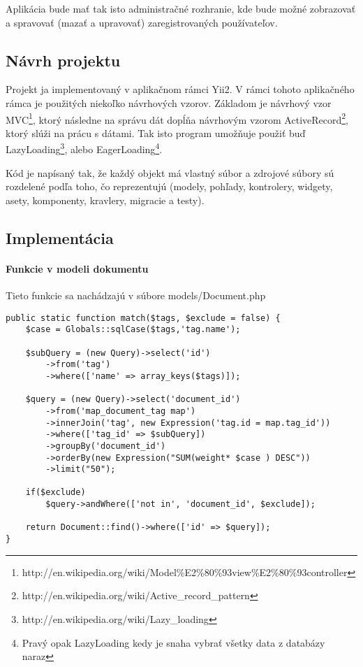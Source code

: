 Aplikácia bude mať tak isto administračné rozhranie, kde bude možné zobrazovať a
spravovať (mazať a upravovať) zaregistrovaných používateľov.

\subsection{Návrh projektu}

Projekt ja implementovaný v aplikačnom rámci Yii2. V rámci tohoto aplikačného rámca 
je použitých niekoľko návrhových vzorov. Základom je návrhový vzor
MVC\footnote{http://en.wikipedia.org/wiki/Model\%E2\%80\%93view\%E2\%80\%93controller}, 
ktorý následne na správu dát dopĺňa návrhovým vzorom
ActiveRecord\footnote{http://en.wikipedia.org/wiki/Active\_record\_pattern}, ktorý
slúži na prácu s dátami. Tak isto program umožňuje použiť buď LazyLoading\footnote{http://en.wikipedia.org/wiki/Lazy\_loading}, alebo 
EagerLoading\footnote{Pravý opak LazyLoading kedy je snaha vybrať všetky data z databázy naraz}.

Kód je napísaný tak, že každý objekt má vlastný súbor a zdrojové súbory sú rozdelené podľa
toho, čo reprezentujú (modely, pohľady, kontrolery, widgety, asety, komponenty, kravlery,
migracie a testy).

\subsection{Implementácia}

\paragraph{Funkcie v modeli dokumentu}

Tieto funkcie sa nachádzajú v súbore models/Document.php

\begin{lstlisting}[code=php,
caption=Funkcia na porovnanie dokumentu so sadou ováhovaných značiek]
public static function match($tags, $exclude = false) {
    $case = Globals::sqlCase($tags,'tag.name');

    $subQuery = (new Query)->select('id')
        ->from('tag')
        ->where(['name' => array_keys($tags)]);

    $query = (new Query)->select('document_id')
        ->from('map_document_tag map')
        ->innerJoin('tag', new Expression('tag.id = map.tag_id'))
        ->where(['tag_id' => $subQuery])
        ->groupBy('document_id')
        ->orderBy(new Expression("SUM(weight* $case ) DESC"))
        ->limit("50");

    if($exclude)
        $query->andWhere(['not in', 'document_id', $exclude]);

    return Document::find()->where(['id' => $query]);
}
\end{lstlisting}

